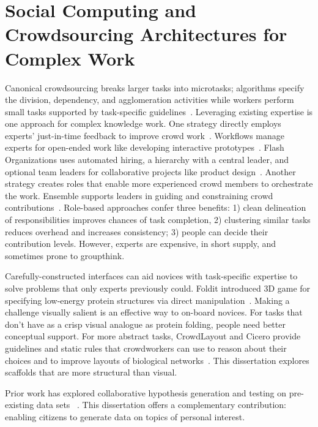 \section{Social Computing and Crowdsourcing Architectures for Complex Work}
Canonical crowdsourcing breaks larger tasks into microtasks; algorithms specify the division,
dependency, and agglomeration activities while workers perform small tasks supported by task-specific
guidelines~\cite{kittur2012future}. Leveraging existing expertise is one approach for complex knowledge work. One strategy
directly employs experts’ just-in-time feedback to improve crowd work~\cite{dow2012shepherding}. Workflows manage
experts for open-ended work like developing interactive prototypes~\cite{Retelny2014}. 
Flash Organizations uses automated hiring, a hierarchy with a central leader, and optional 
team leaders for collaborative projects like product design~\cite{Valentine2017}.
Another strategy creates roles that enable more experienced crowd members to orchestrate
the work. Ensemble supports leaders in guiding and constraining crowd 
contributions~\cite{Kim2014e}. Role-based approaches confer three benefits: 1) clean 
delineation of responsibilities improves chances of task completion, 2) clustering similar tasks 
reduces overhead and increases consistency; 3) people can decide their contribution levels. 
However, experts are expensive, in short supply, and sometimes prone to groupthink. 

Carefully-constructed interfaces can aid novices with task-specific expertise to solve problems 
that only experts previously could. Foldit introduced 3D game for specifying low-energy protein 
structures via direct manipulation~\cite{Cooper2010}. Making a challenge visually salient is an 
effective way to on-board novices. For tasks that don’t have as a crisp visual analogue as protein
folding, people need better conceptual support. For more abstract tasks, CrowdLayout and Cicero
provide guidelines and static rules that crowdworkers can use to reason about their choices and
to improve layouts of biological networks~\cite{Singh:2018:CCD:3173574.3173806, chen2019cicero}.
This dissertation explores scaffolds that are more structural than visual.

Prior work has explored  collaborative hypothesis generation and testing on pre-existing data sets
~\cite{luther2009pathfinder,willett2011commentspace}. This dissertation offers a 
complementary contribution: enabling citizens to generate data on topics of personal interest. 

